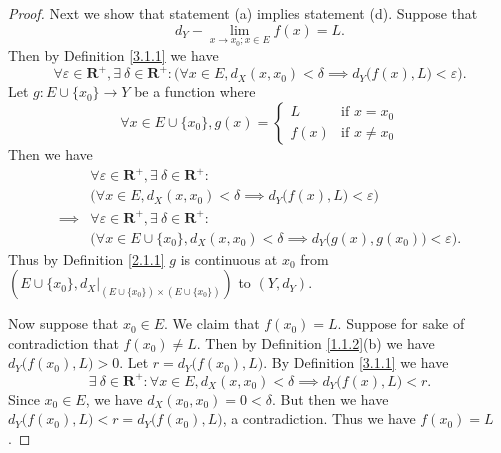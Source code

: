 \begin{proof}
    Next we show that statement (a) implies statement (d).
    Suppose that
    \[
        d_Y - \lim_{x \to x_0 ; x \in E} f(x) = L.
    \]
    Then by Definition \ref{3.1.1} we have
    \[
        \forall \varepsilon \in \mathbf{R}^+, \exists\ \delta \in \mathbf{R}^+ : \Big(\forall x \in E, d_X(x, x_0) < \delta \implies d_Y\big(f(x), L\big) < \varepsilon\Big).
    \]
    Let \(g : E \cup \{x_0\} \to Y\) be a function where
    \[
        \forall x \in E \cup \{x_0\}, g(x) = \begin{cases}
            L    & \text{if } x = x_0    \\
            f(x) & \text{if } x \neq x_0
        \end{cases}
    \]
    Then we have
    \begin{align*}
                 & \forall \varepsilon \in \mathbf{R}^+, \exists\ \delta \in \mathbf{R}^+ :                                       \\
                 & \Big(\forall x \in E, d_X(x, x_0) < \delta \implies d_Y\big(f(x), L\big) < \varepsilon\Big)                    \\
        \implies & \forall \varepsilon \in \mathbf{R}^+, \exists\ \delta \in \mathbf{R}^+ :                                       \\
                 & \Big(\forall x \in E \cup \{x_0\}, d_X(x, x_0) < \delta \implies d_Y\big(g(x), g(x_0)\big) < \varepsilon\Big).
    \end{align*}
    Thus by Definition \ref{2.1.1} \(g\) is continuous at \(x_0\) from \((E \cup \{x_0\}, d_X|_{(E \cup \{x_0\}) \times (E \cup \{x_0\})})\) to \((Y, d_Y)\).

    Now suppose that \(x_0 \in E\).
    We claim that \(f(x_0) = L\).
    Suppose for sake of contradiction that \(f(x_0) \neq L\).
    Then by Definition \ref{1.1.2}(b) we have \(d_Y\big(f(x_0), L\big) > 0\).
    Let \(r = d_Y\big(f(x_0), L\big)\).
    By Definition \ref{3.1.1} we have
    \[
        \exists\ \delta \in \mathbf{R}^+ : \forall x \in E, d_X(x, x_0) < \delta \implies d_Y\big(f(x), L\big) < r.
    \]
    Since \(x_0 \in E\), we have \(d_X(x_0, x_0) = 0 < \delta\).
    But then we have \(d_Y\big(f(x_0), L\big) < r = d_Y\big(f(x_0), L\big)\), a contradiction.
    Thus we have \(f(x_0) = L\).


\end{proof}
